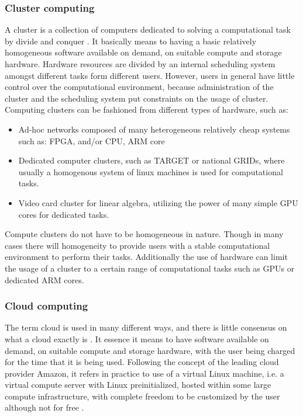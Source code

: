 \subsubsection{Cluster computing}
A cluster is a collection of computers dedicated to solving a computational task by divide 
and conquer \cite{Silva:1999, Qiu:2010}. It basically means to having a basic relatively 
homogeneous software available on demand, on suitable compute and storage hardware. Hardware 
resources are divided by an internal scheduling system amongst different tasks form different 
users. However, users in general have little control over the computational environment, 
because administration of the cluster and the scheduling system put constraints on the usage 
of cluster. Computing clusters can be fashioned from different types of hardware, such as:
\begin{itemize}
  \item Ad-hoc networks composed of many heterogeneous relatively cheap systems such as: FPGA, and/or CPU, ARM core
  \item Dedicated computer clusters, such as TARGET or national GRIDs, where usually a homogenous system of linux machines is used for computational tasks.
  \item Video card cluster for linear algebra, utilizing the power of many simple GPU cores for dedicated tasks.
\end{itemize}
Compute clusters do not have to be homogeneous in nature. Though in many cases there will 
homogeneity to provide users with a stable computational environment to perform their tasks. 
Additionally the use of hardware can limit the usage of a cluster to a certain range of 
computational tasks such as GPUs or dedicated ARM cores.

\subsubsection*{Cloud computing}
The term cloud is used in many different ways, and there is little consensus on what a cloud 
exactly is \cite{Foster:2008}. It essence it means to have software available 
on demand, on suitable compute and storage hardware, with the user being charged for the time 
that it is being used. Following the concept of the leading cloud provider Amazon, it refers 
in practice to use of a virtual Linux machine, i.e. a virtual compute server with Linux 
preinitialized, hosted within some large compute infrastructure, with complete freedom to be 
customized by the user although not for free \cite{Trelles:2011}.

